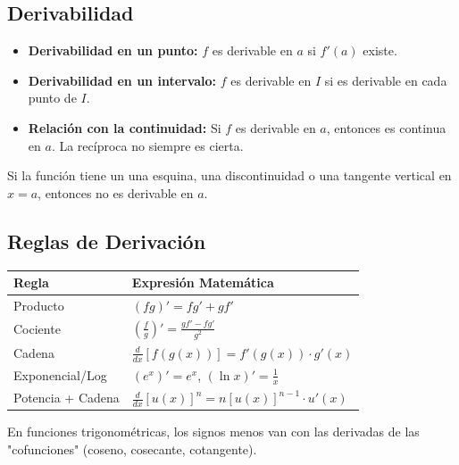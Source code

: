 \documentclass[a4paper,12pt]{article}
\theoremstyle{definition}
\begin{document}
\subsection{Derivabilidad}
\begin{itemize}
    \item \textbf{Derivabilidad en un punto:} $f$ es derivable en $a$ si $f'(a)$ existe.
    \item \textbf{Derivabilidad en un intervalo:} $f$ es derivable en $I$ si es derivable en cada punto de $I$.
    \item \textbf{Relación con la continuidad:} Si $f$ es derivable en $a$, entonces es continua en $a$. La recíproca no siempre es cierta.
\end{itemize}

\begin{tcolorbox}[title=No Derivabilidad]
    Si la función tiene un una esquina, una discontinuidad o una tangente vertical en $x=a$, entonces no es derivable en $a$.
\end{tcolorbox}

\subsection{Reglas de Derivación}
\begin{table}[h!]
    \centering
    \renewcommand{\arraystretch}{1.4}
    \begin{tabular}{l l}
        \toprule
        \textbf{Regla} & \textbf{Expresión Matemática} \\
        \midrule
        Producto & $(fg)' = f g' + g f'$ \\
        Cociente & $\left(\frac{f}{g}\right)' = \frac{g f' - f g'}{g^2}$ \\
        Cadena & $\frac{d}{dx}[f(g(x))] = f'(g(x)) \cdot g'(x)$ \\
        Exponencial/Log & $(e^x)' = e^x$, \quad $(\ln x)' = \frac{1}{x}$ \\
        Potencia + Cadena & $\frac{d}{dx}[u(x)]^n = n[u(x)]^{n-1} \cdot u'(x)$ \\
        \bottomrule
    \end{tabular}
\end{table}

\begin{tcolorbox}[title=Derivadas Trigonométricas]
    En funciones trigonométricas, los signos menos van con las derivadas de las "cofunciones" (coseno, cosecante, cotangente).
\end{tcolorbox}
\end{document}
